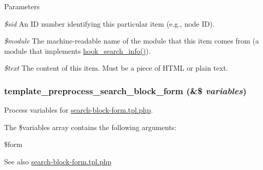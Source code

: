 \begin{DoxyParams}{Parameters}
\item[{\em \$sid}]An ID number identifying this particular item (e.g., node ID). \item[{\em \$module}]The machine-\/readable name of the module that this item comes from (a module that implements \hyperlink{group__search_ga37b761616f2cad4796891008f2b374f3}{hook\_\-search\_\-info()}). \item[{\em \$text}]The content of this item. Must be a piece of HTML or plain text. \end{DoxyParams}
\hypertarget{group__search_ga545a7c7108d985d17d8b8b4054ba66ef}{
\subsubsection[{template\_\-preprocess\_\-search\_\-block\_\-form}]{\setlength{\rightskip}{0pt plus 5cm}template\_\-preprocess\_\-search\_\-block\_\-form (\&\$ {\em variables})}}
\label{group__search_ga545a7c7108d985d17d8b8b4054ba66ef}
Process variables for \hyperlink{search-block-form_8tpl_8php}{search-\/block-\/form.tpl.php}.

The \$variables array contains the following arguments:
\begin{DoxyItemize}
\item \$form
\end{DoxyItemize}

\begin{DoxySeeAlso}{See also}
\hyperlink{search-block-form_8tpl_8php}{search-\/block-\/form.tpl.php} 
\end{DoxySeeAlso}
